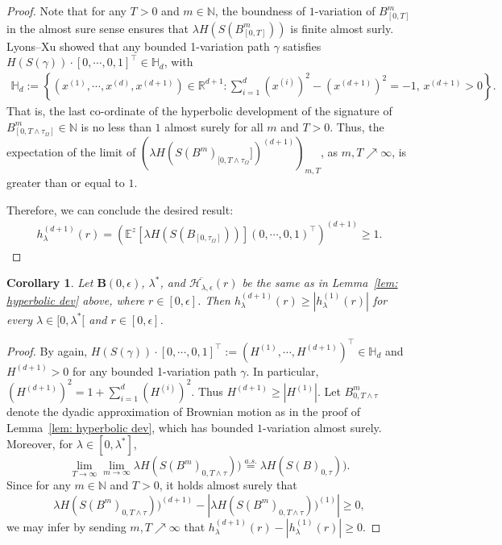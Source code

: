 \documentclass[11pt,a4paper,english,reqno]{amsart}
\theoremstyle{plain}
\newtheorem{corollary}[definition]{Corollary}
\newcommand{\R}{\mathbb{R}}
\newcommand{\e}{\epsilon}
\newcommand{\1}{\mathbbm{1}}
\begin{document}
\begin{proof}
Note that for any $T>0$ and $m \in \mathbb{N}$, the boundness of $1$-variation of $B^{m}_{[0, T]}$ in the almost sure sense ensures that $\lambda H\left(S\left(B^{m}_{[0, T]}\right)\right)$ is finite almost surly.
Lyons--Xu \cite{lyons2017hyperbolic} showed that any bounded 1-variation path $\gamma$ satisfies $
H\left(S(\gamma)\right)\cdot  [0,\cdots, 0,1]^\top \in \mathbb{H}_d$, with 
\begin{eqnarray*}\mathbb{H}_d := \left\{\left(x^{(1)},\cdots, x^{(d)},x^{(d+1)}\right)\in\R^{d+1}: \sum_{i = 1}^{d}\left(x^{(i)}\right)^2 - \left(x^{(d+1)}\right)^2=-1,\, x^{(d+1)}>0\right\}.
\end{eqnarray*}
That is, the last co-ordinate of the hyperbolic development of the signature of $B^{m}_{[0, T \wedge \tau_{\Omega}]} \in \mathbb{N}$ is no less than $1$ almost surely for all $m$ and $T>0$. Thus, the expectation of the limit of $\left(\lambda H(S(B^{m})_{[0, T \wedge \tau_{\Omega}}])^{(d+1)}\right)_{m, T}$, as $m,T \nearrow \infty$, is greater than or equal to $1$.


Therefore, we can conclude the desired result:
\begin{align*}
    h^{(d+1)}_{\lambda}(r) =  \left( \mathbb{E}^{z}\left[\lambda H\left(S\left(B_{\left[0, \tau_{\Omega}\right]}\right)\right)\right]\left(0, \cdots, 0, 1\right)^{\top} \right)^{(d+1)}\geq 1.
\end{align*}
\end{proof}


\begin{corollary}\label{cor: new}
Let $\mathbf{B}(0,\e)$, $\lambda^\ast$, and $\overline{\mathcal{H}_{\lambda, \e}}(r)$ be the same as in Lemma~\ref{lem: hyperbolic dev} above, where $r \in [0, \e]$. Then $h^{(d+1)}_{\lambda}(r) \geq \left|h^{(1)}_{\lambda}(r)\right|$ for every $\lambda \in [0, \lambda^{*}[$ and $r \in [0,\e]$.
\end{corollary}

\begin{proof} 
By \cite{lyons2017hyperbolic} again, $H\left(S(\gamma)\right)\cdot  [0,\cdots, 0,1]^\top := \left(H^{(1)}, \cdots, H^{(d+1)}\right)^{\top}\in \mathbb{H}_d$ and $H^{(d+1)} > 0$ for any bounded 1-variation path $\gamma$. In particular, $\left(H^{(d+1)}\right)^2 = 1+\sum_{i = 1}^{d} \left(H^{(i)}\right)^{2}$. Thus $H^{(d+1)} \geq \left|H^{(1)}\right|$. Let $B^{m}_{0, T\wedge \tau}$ denote the dyadic approximation of Brownian motion as in the proof of Lemma~\ref{lem: hyperbolic dev}, which has bounded $1$-variation almost surely. Moreover, for $\lambda \in [0, \lambda^{*}]$,
$$
\lim_{T \rightarrow \infty}\lim_{m \rightarrow \infty}\lambda H (S(B^m)_{0, T\wedge \tau})) \overset{a.s.}{=}\lambda H (S(B)_{0, \tau})).
$$ 
Since for any $m \in \mathbb{N}$ and $T >0$, it holds almost surely that
$$
\lambda H (S(B^m)_{0, T\wedge \tau}))^{(d+1)} -\left|\lambda H (S(B^m)_{0, T\wedge \tau}))^{(1)}\right| \geq 0,
$$
we may infer by sending $m,T\nearrow \infty$ that $
h^{(d+1)}_{\lambda}(r) - \left|h^{(1)}_{\lambda}(r)\right| \geq 0.$   \end{proof}
\end{document}

